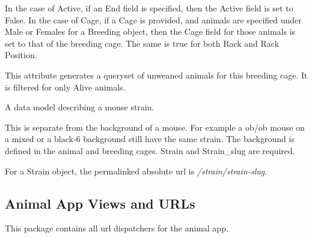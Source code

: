 \documentclass[letterpaper,10pt,english]{sphinxmanual}
\begin{document}
\begin{fulllineitems}
\begin{fulllineitems}
In the case of Active, if an End field is specified, then the Active field is set to False.
In the case of Cage, if a Cage is provided, and animals are specified under Male or Females for a Breeding object, then the Cage field for those animals is set to that of the breeding cage.  The same is true for both Rack and Rack Position.

\end{fulllineitems}


\begin{fulllineitems}
\label{animals:mousedb.animal.models.Breeding.unweaned}
This attribute generates a queryset of unweaned animals for this breeding cage.  It is filtered for only Alive animals.

\end{fulllineitems}


\end{fulllineitems}


\begin{fulllineitems}
\label{animals:mousedb.animal.models.Strain}
A data model describing a mouse strain.

This is separate from the background of a mouse.  For example a ob/ob mouse on a mixed or a black-6 background still have the same strain.  The background is defined in the animal and breeding cages.  Strain and Strain\_slug are required.

\begin{fulllineitems}
\label{animals:mousedb.animal.models.Strain.get_absolute_url}
For a Strain object, the permalinked absolute url is \emph{/strain/strain-slug}.

\end{fulllineitems}


\end{fulllineitems}



\subsection{Animal App Views and URLs}
\label{animals:module-mousedb.animal.urls}\label{animals:animal-app-views-and-urls}
This package contains all url dispatchers for the animal app.
\end{document}
